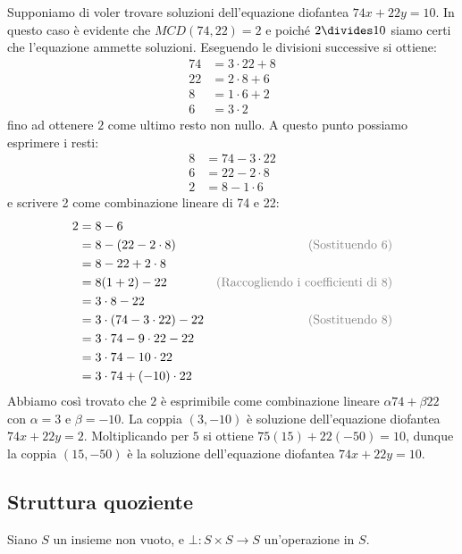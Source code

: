 \begin{example}
	Supponiamo di voler trovare soluzioni dell'equazione diofantea $74x+22y=10$. In questo caso è evidente che $MCD(74,22)=2$ e poiché $2 \divides 10$ siamo certi che l'equazione ammette soluzioni. Eseguendo le divisioni successive si ottiene:
	\begin{align*}
		74 &= 3 \cdot 22 + 8 \\
		22 &= 2 \cdot 8 + 6 \\
		8 &= 1 \cdot 6 + 2 \\
		6 &= 3 \cdot 2
	\end{align*}
	fino ad ottenere $2$ come ultimo resto non nullo. A questo punto possiamo esprimere i resti:
	\begin{align*}
		8 &= 74 - 3 \cdot 22 \\
		6 &= 22 - 2 \cdot 8 \\
		2 &= 8 - 1 \cdot 6
	\end{align*}
	e scrivere 2 come combinazione lineare di 74 e 22:
	\begin{align*}
		2 &= 8 - 6 & \\
		&= 8 - (22- 2 \cdot 8) & \text{\textcolor{gray}{(Sostituendo 6)}}\\
		&= 8 - 22 + 2 \cdot 8 \\
		&= 8 (1+2) - 22 &  \text{\textcolor{gray}{(Raccogliendo i coefficienti di 8)}}\\
		&= 3 \cdot 8 -22 \\
		&= 3 \cdot (74 - 3 \cdot 22) - 22 & \text{\textcolor{gray}{(Sostituendo 8)}} \\
		&= 3 \cdot 74 - 9 \cdot 22 - 22 \\
		&= 3 \cdot 74 - 10 \cdot 22 \\
		&= 3 \cdot 74 + (-10) \cdot 22
	\end{align*}
	Abbiamo così trovato che $2$ è esprimibile come combinazione lineare $\alpha 74 + \beta 22$ con $\alpha=3$ e $\beta=-10$. La coppia $(3,-10)$ è soluzione dell'equazione diofantea $74x+22y=2$. Moltiplicando per $5$ si ottiene $75 (15) + 22(-50) =10$, dunque la coppia $(15,-50)$ è la soluzione dell'equazione diofantea $74x+22y=10$.
\end{example}

\subsection{Struttura quoziente}\label{sez:congruenze}
Siano $S$ un insieme non vuoto, e $\bot: S \times S \longrightarrow S$ un'operazione in $S$.

